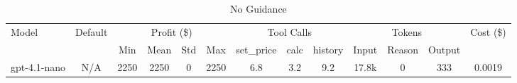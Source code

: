 \begin{table}[h]
\centering
\small
\caption{No Guidance}
\begin{tabular}{|l|c|c|c|c|c|c|c|c|c|c|c|c|}
\hline
\multirow{2}{*}{Model} & \multirow{2}{*}{Default} & \multicolumn{4}{c|}{Profit (\$)} & \multicolumn{3}{c|}{Tool Calls} & \multicolumn{3}{c|}{Tokens} & \multirow{2}{*}{Cost (\$)} \\
\cline{3-12}
& & Min & Mean & Std & Max & set\_price & calc & history & Input & Reason & Output & \\
\hline
gpt-4.1-nano & N/A & 2250 & 2250 & 0 & 2250 & 6.8 & 3.2 & 9.2 & 17.8k & 0 & 333 & 0.0019 \\
\hline
\end{tabular}
\end{table}